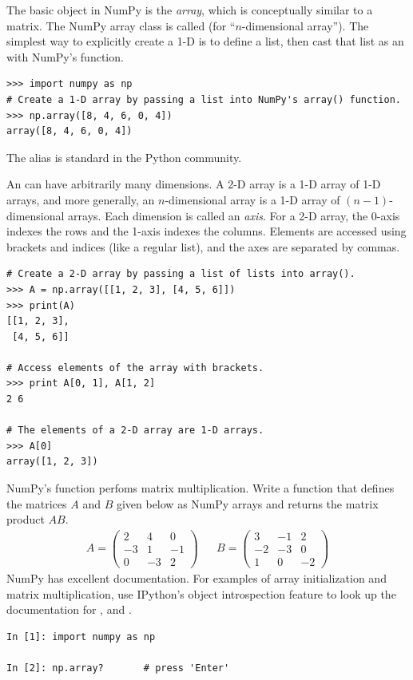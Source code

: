 The basic object in NumPy is the \emph{array}, which is conceptually similar to a matrix.
The NumPy array class is called  (for ``$n$-dimensional array'').
The simplest way to explicitly create a 1-D  is to define a list, then cast that list as an  with NumPy's  function.

\begin{lstlisting}
>>> import numpy as np
# Create a 1-D array by passing a list into NumPy's array() function.
>>> np.array([8, 4, 6, 0, 4])
array([8, 4, 6, 0, 4])
\end{lstlisting}
The alias  is standard in the Python community.

An  can have arbitrarily many dimensions.
A 2-D array is a 1-D array of 1-D arrays, and more generally, an $n$-dimensional array is a 1-D array of $(n-1)$-dimensional arrays.
Each dimension is called an \emph{axis}.
For a 2-D array, the 0-axis indexes the rows and the 1-axis indexes the columns.
Elements are accessed using brackets and indices (like a regular list), and the axes are separated by commas.

\begin{lstlisting}
# Create a 2-D array by passing a list of lists into array().
>>> A = np.array([[1, 2, 3], [4, 5, 6]])
>>> print(A)
[[1, 2, 3],
 [4, 5, 6]]

# Access elements of the array with brackets.
>>> print A[0, 1], A[1, 2]
2 6

# The elements of a 2-D array are 1-D arrays.
>>> A[0]
array([1, 2, 3])
\end{lstlisting}

\begin{problem} %
NumPy's  function perfoms matrix multiplication. %
Write a function that defines the matrices $A$ and $B$ given below as NumPy arrays and returns the matrix product $AB$.
%
\begin{align*}
A = \left(\begin{array}{rrr}
2 & 4 & 0 \\ 
-3 & 1 &-1 \\
0 & -3 & 2 \end{array}\right)
&&
B = \left(\begin{array}{rrr}
3 & -1 & 2 \\ 
-2 & -3 & 0 \\
1 & 0 & -2 \end{array}\right)
\end{align*}
%
NumPy has excellent documentation.
For examples of array initialization and matrix multiplication, use IPython's object introspection feature to look up the documentation for ,  and .
\begin{lstlisting}
In [1]: import numpy as np

In [2]: np.array?       # press 'Enter'
\end{lstlisting}
\label{prob:simple_multiply}
\end{problem}

